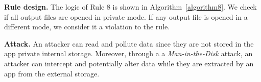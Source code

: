 \textbf{Rule design.} The logic of Rule 8 is shown in Algorithm~\ref{algorithm8}.  We check if all output files are opened in private mode. If any output file is opened in a different mode, we consider it a violation to the rule. 

\begin{algorithm}[]
\SetAlgoLined
{}
\caption{}
\label{algorithm8}
\end{algorithm}

\textbf{Attack.} An attacker can read and pollute data since they are not stored in the app private internal storage. Moreover, through a a \textit{Man-in-the-Disk} attack, an attacker can intercept and potentially alter data while they are extracted by an app from the external storage. 

